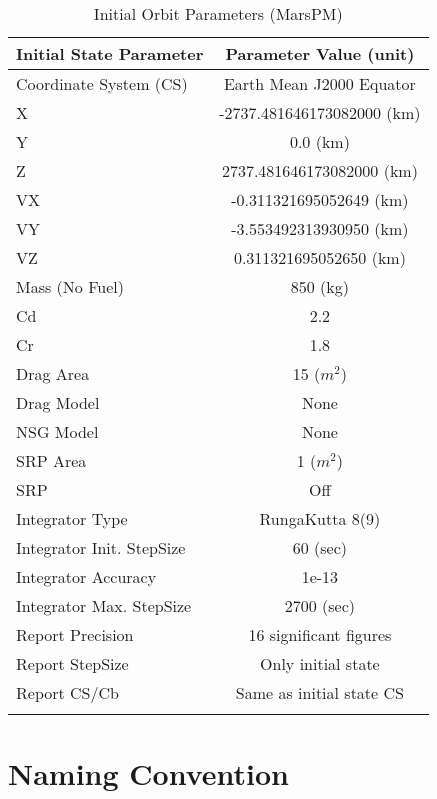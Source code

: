 \begin{table}[htbp!]
\centering \caption{Initial Orbit Parameters (MarsPM)}
      \begin{tabular}{lc}
      \hline\hline
            Initial State Parameter & Parameter Value (unit)\\
            \hline
            Coordinate System (CS) & Earth Mean J2000 Equator\\
            X & -2737.481646173082000 (km)\\
            Y & 0.0 (km)\\
            Z & 2737.481646173082000 (km)\\
            VX & -0.311321695052649 (km)\\
            VY & -3.553492313930950 (km)\\
            VZ & 0.311321695052650 (km)\\
            Mass (No Fuel) & 850 (kg)\\
            Cd & 2.2\\
            Cr & 1.8\\
            Drag Area & 15 ($m^2$)\\
            Drag Model & None\\
            NSG Model & None\\
            SRP Area & 1 ($m^2$)\\
            SRP & Off\\
            Integrator Type & RungaKutta 8(9)\\
            Integrator Init. StepSize & 60 (sec)\\
            Integrator Accuracy & 1e-13\\
            Integrator Max. StepSize & 2700 (sec)\\
            Report Precision & 16 significant figures\\
            Report StepSize & Only initial state\\
            Report CS/Cb & Same as initial state CS\\
      \hline\hline
      \label{Table: InitStopCondStateMarsPM}
\end{tabular}
\end{table}

\clearpage
\section{Naming Convention}
\label{nameConvStopCond}



